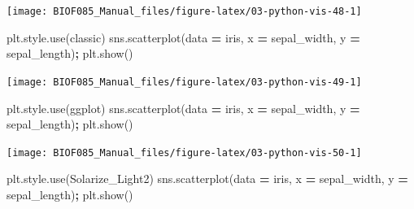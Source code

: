 \documentclass[
  letterpaper,
]{scrbook}
\newenvironment{Shaded}{\begin{snugshade}}{\end{snugshade}}
\newcommand{\NormalTok}[1]{#1}
\newcommand{\OperatorTok}[1]{\textcolor[rgb]{0.81,0.36,0.00}{\textbf{#1}}}
\newcommand{\StringTok}[1]{\textcolor[rgb]{0.31,0.60,0.02}{#1}}
\begin{document}
\begin{center}\texttt{[image: BIOF085\_Manual\_files/figure-latex/03-python-vis-48-1]} \end{center}

\begin{Shaded}
\begin{Highlighting}[]
\NormalTok{plt.style.use(}\StringTok{\textquotesingle{}classic\textquotesingle{}}\NormalTok{)}
\NormalTok{sns.scatterplot(data }\OperatorTok{=}\NormalTok{ iris, x }\OperatorTok{=} \StringTok{\textquotesingle{}sepal\_width\textquotesingle{}}\NormalTok{, y }\OperatorTok{=} \StringTok{\textquotesingle{}sepal\_length\textquotesingle{}}\NormalTok{)}\OperatorTok{;}
\NormalTok{plt.show()}
\end{Highlighting}
\end{Shaded}

\begin{center}\texttt{[image: BIOF085\_Manual\_files/figure-latex/03-python-vis-49-1]} \end{center}

\begin{Shaded}
\begin{Highlighting}[]
\NormalTok{plt.style.use(}\StringTok{\textquotesingle{}ggplot\textquotesingle{}}\NormalTok{)}
\NormalTok{sns.scatterplot(data }\OperatorTok{=}\NormalTok{ iris, x }\OperatorTok{=} \StringTok{\textquotesingle{}sepal\_width\textquotesingle{}}\NormalTok{, y }\OperatorTok{=} \StringTok{\textquotesingle{}sepal\_length\textquotesingle{}}\NormalTok{)}\OperatorTok{;}
\NormalTok{plt.show()}
\end{Highlighting}
\end{Shaded}

\begin{center}\texttt{[image: BIOF085\_Manual\_files/figure-latex/03-python-vis-50-1]} \end{center}

\begin{Shaded}
\begin{Highlighting}[]
\NormalTok{plt.style.use(}\StringTok{\textquotesingle{}Solarize\_Light2\textquotesingle{}}\NormalTok{)}
\NormalTok{sns.scatterplot(data }\OperatorTok{=}\NormalTok{ iris, x }\OperatorTok{=} \StringTok{\textquotesingle{}sepal\_width\textquotesingle{}}\NormalTok{, y }\OperatorTok{=} \StringTok{\textquotesingle{}sepal\_length\textquotesingle{}}\NormalTok{)}\OperatorTok{;}
\NormalTok{plt.show()}
\end{Highlighting}
\end{Shaded}
\end{document}
